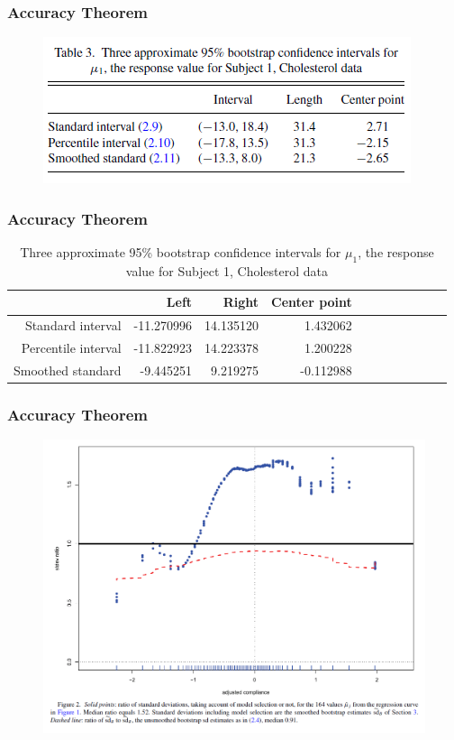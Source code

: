 \documentclass{beamer}
\begin{document}
\begin{frame}
\frametitle{Accuracy Theorem}
\begin{figure}[h]
\centering
\includegraphics[width=220bp, height= 90bp]{table3_e.png}
\end{figure}
\end{frame}
\begin{frame}
\frametitle{Accuracy Theorem}
\begin{table}[]
\centering
\caption{Three approximate 95\% bootstrap confidence intervals for $\mu_1$, the response value for Subject 1, Cholesterol data}
\label{my-label}
\begin{tabular}{rrrrrrrrrrr}
\hline
& Left & Right & Center point\\
\hline
Standard interval &  -11.270996 &14.135120 & 1.432062\\
Percentile interval & -11.822923 &14.223378 & 1.200228\\
Smoothed standard & -9.445251 & 9.219275 & -0.112988\\
\hline
\end{tabular}
\end{table}
\end{frame}
\begin{frame}
\frametitle{Accuracy Theorem}
\begin{figure}[h]
\centering
\includegraphics[width=270bp, height= 200bp]{figure2_e.png}
\end{figure}
\end{frame}
\end{document}
